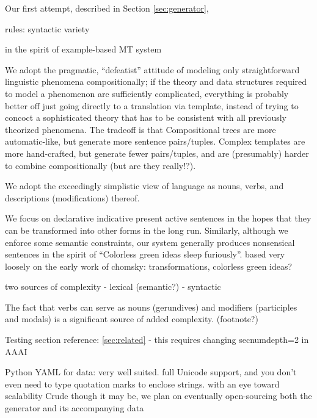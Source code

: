 Our first attempt, described in Section \ref{sec:generator}, 

rules: syntactic variety

in the spirit of example-based MT system 

We adopt the pragmatic, ``defeatist'' attitude of modeling only straightforward linguistic phenomena compositionally; if the theory and data structures required to model a phenomenon are sufficiently complicated, everything is probably better off just going directly to a translation via template, instead of trying to concoct a sophisticated theory that has to be consistent with all previously theorized phenomena.
The tradeoff is that 
Compositional trees are more automatic-like, but generate more sentence pairs/tuples.
Complex templates are more hand-crafted, but generate fewer pairs/tuples, and are (presumably) harder to combine compositionally (but are they really!?).

We adopt the exceedingly simplistic view of language as nouns, verbs, and descriptions (modifications) thereof.

We focus on declarative indicative present active sentences in the hopes that they can be transformed into other forms in the long run.
Similarly, although we enforce some semantic constraints, our system generally produces nonsensical sentences in the spirit of ``Colorless green ideas sleep furiously''.
based very loosely on the early work of chomsky: transformations, colorless green ideas? 


two sources of complexity
- lexical (semantic?)
- syntactic 

The fact that verbs can serve as nouns (gerundives) and modifiers (participles and modals) is a significant source of added complexity. (footnote?)

Testing section reference: \ref{sec:related} - this requires changing secnumdepth=2 in AAAI

Python
YAML for data: very well suited. full Unicode support, and you don't even need to type quotation marks to enclose strings.
with an eye toward scalability
Crude though it may be, we plan on eventually open-sourcing both the generator and its accompanying data





